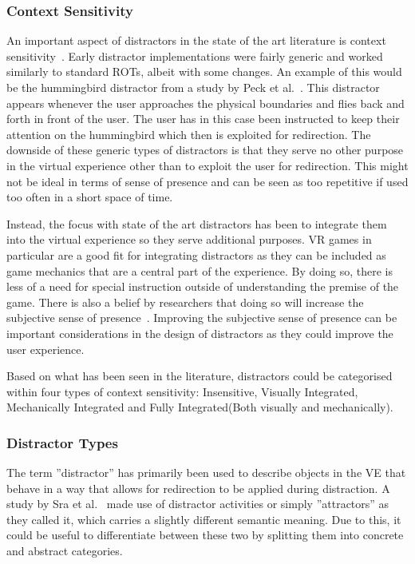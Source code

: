 \subsubsection{Context Sensitivity}
An important aspect of distractors in the state of the art literature is context sensitivity~\cite{chen2017towards, chen2017supporting, sra2018vmotion}. Early distractor implementations were fairly generic and worked similarly to standard ROTs, albeit with some changes. An example of this would be the hummingbird distractor from a study by Peck et al.~\cite{peck2011evaluation}. This distractor appears whenever the user approaches the physical boundaries and flies back and forth in front of the user. The user has in this case been instructed to keep their attention on the hummingbird which then is exploited for redirection. The downside of these generic types of distractors is that they serve no other purpose in the virtual experience other than to exploit the user for redirection. This might not be ideal in terms of sense of presence and can be seen as too repetitive if used too often in a short space of time. 

Instead, the focus with state of the art distractors has been to integrate them into the virtual experience so they serve additional purposes. VR games in particular are a good fit for integrating distractors as they can be included as game mechanics that are a central part of the experience. By doing so, there is less of a need for special instruction outside of understanding the premise of the game. There is also a belief by researchers that doing so will increase the subjective sense of presence~\cite{chen2017supporting, sra2018vmotion}. Improving the subjective sense of presence can be important considerations in the design of distractors as they could improve the user experience. 

Based on what has been seen in the literature, distractors could be categorised within four types of context sensitivity: Insensitive, Visually Integrated, Mechanically Integrated and Fully Integrated(Both visually and mechanically).

\subsubsection{Distractor Types}
The term ''distractor'' has primarily been used to describe objects in the VE that behave in a way that allows for redirection to be applied during distraction. A study by Sra et al.~\cite{sra2018vmotion} made use of distractor activities or simply ''attractors'' as they called it, which carries a slightly different semantic meaning. Due to this, it could be useful to differentiate between these two by splitting them into concrete and abstract categories.

